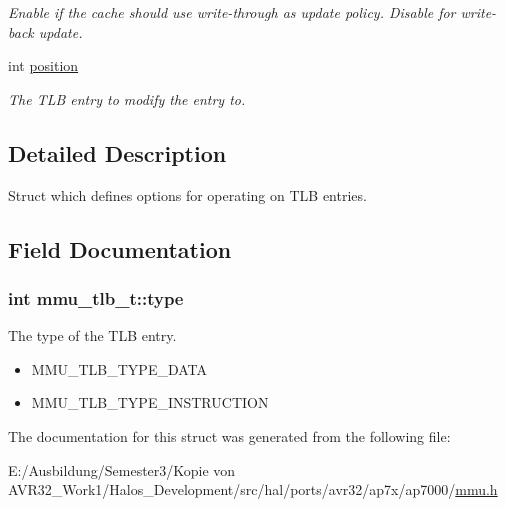 \begin{CompactItemize}
\begin{CompactList}\small\item\em Enable if the cache should use write-through as update policy. Disable for write-back update. \item\end{CompactList}\item 
\hypertarget{structmmu__tlb__t_c3347ab70ce218cf7abfa442a813c88a}{
int \hyperlink{structmmu__tlb__t_c3347ab70ce218cf7abfa442a813c88a}{position}}
\label{structmmu__tlb__t_c3347ab70ce218cf7abfa442a813c88a}

\begin{CompactList}\small\item\em The TLB entry to modify the entry to. \item\end{CompactList}\end{CompactItemize}


\subsection{Detailed Description}
Struct which defines options for operating on TLB entries. 

\subsection{Field Documentation}
\hypertarget{structmmu__tlb__t_6bb98a71abde4276e7f57bb8d35492cb}{
\subsubsection[{type}]{\setlength{\rightskip}{0pt plus 5cm}int {\bf mmu\_\-tlb\_\-t::type}}}
\label{structmmu__tlb__t_6bb98a71abde4276e7f57bb8d35492cb}


The type of the TLB entry. 

\begin{itemize}
\item MMU\_\-TLB\_\-TYPE\_\-DATA \item MMU\_\-TLB\_\-TYPE\_\-INSTRUCTION \end{itemize}


The documentation for this struct was generated from the following file:\begin{CompactItemize}
\item 
E:/Ausbildung/Semester3/Kopie von AVR32\_\-Work1/Halos\_\-Development/src/hal/ports/avr32/ap7x/ap7000/\hyperlink{mmu_8h}{mmu.h}\end{CompactItemize}
